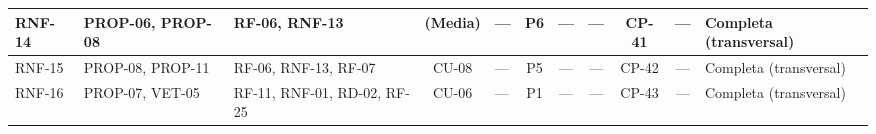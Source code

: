\documentclass[journal,onecolumn]{IEEEtran}
\begin{document}
\begin{landscape}
\begin{table}[H]
\begin{tabularx}{\linewidth}{|l|X|X|c|X|c|c|c|c|c|X|}
				RNF-14 & PROP-06, PROP-08 & RF-06, RNF-13 & (Media) & --- & P6 & --- & --- & CP-41 & --- & Completa (transversal) \\ \hline
				RNF-15 & PROP-08, PROP-11 & RF-06, RNF-13, RF-07 & CU-08 & --- & P5 & --- & --- & CP-42 & --- & Completa (transversal) \\ \hline
				RNF-16 & PROP-07, VET-05 & RF-11, RNF-01, RD-02, RF-25 & CU-06 & --- & P1 & --- & --- & CP-43 & --- & Completa (transversal) \\ \hline
			\end{tabularx}
		\end{table}
	\end{landscape}
	
\end{document}
